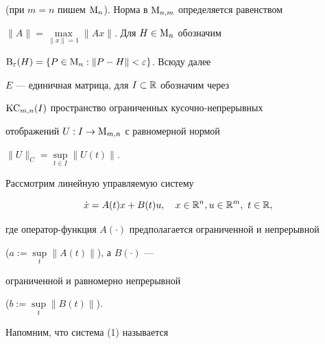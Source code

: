 (при $m=n$ пишем $\operatorname{M}_n$). Норма в $\operatorname{M}_{n,m}$ определяется равенством


$\|A\|=\max\limits_{\|x\|=1}\|Ax\|$. Для $H\in\operatorname{M}_n$ обозначим


$\operatorname{B}_{\varepsilon}(H)=\{P\in\operatorname{M}_{n}:\|P-H\|<\varepsilon\}$. Всюду далее


$E$ --- единичная матрица, для $I\subset\Bbb R$ обозначим через


$\operatorname{KC}_{m,n}(I)$ пространство ограниченных кусочно-непрерывных


отображений $U:I\to\operatorname{M}_{m,n}$ с равномерной нормой


$\|U\|_{C}=\sup\limits_{t\in I}\|U(t)\|$.





Рассмотрим линейную управляемую систему


\begin{equation}


\Dot x=A(t)x+B(t)u, \quad x\in\Rp^n, u\in\Rp^m,\ t\in\Bbb R,


\end{equation}


где оператор-функция $A(\cdot)$ предполагается ограниченной и непрерывной


($a:=\sup\limits_t\|A(t)\|$), а $B(\cdot)$ ---


ограниченной и равномерно непрерывной


($b:=\sup\limits_t\|B(t)\|$).





Напомним, что система (1) называется


